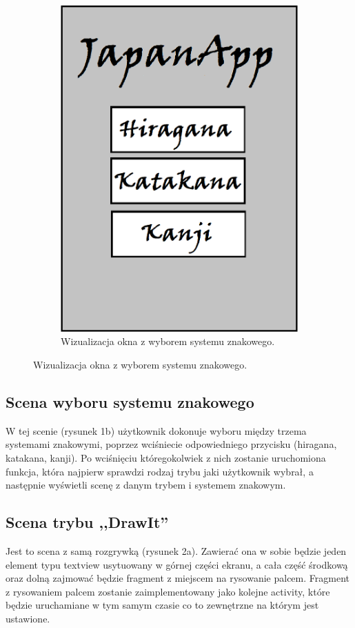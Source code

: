 \documentclass[15pt]{article}
\begin{document}
\begin{figure}[h!]
\begin{subfigure}[b]{0.35\linewidth}
      \includegraphics[width=\linewidth]{chose.png}
      \caption{Wizualizacja okna z wyborem systemu znakowego.}
      \label{fig:rysunek2}
    \end{subfigure}
  \end{figure}
  
  \subsection{Scena wyboru systemu znakowego}
  W tej scenie (rysunek 1b) użytkownik dokonuje wyboru między trzema systemami znakowymi, poprzez wciśniecie odpowiedniego przycisku (hiragana, katakana, kanji). Po wciśnięciu któregokolwiek z nich zostanie uruchomiona funkcja, która najpierw sprawdzi rodzaj trybu jaki użytkownik wybrał, a następnie wyświetli scenę z danym trybem i systemem znakowym. 
  
  
  \subsection{Scena trybu ,,DrawIt''}
  Jest to scena z samą rozgrywką (rysunek 2a). Zawierać ona w sobie będzie jeden element typu textview usytuowany w górnej części ekranu, a cała część środkową oraz dolną zajmować będzie fragment z miejscem na rysowanie palcem. Fragment z rysowaniem palcem zostanie zaimplementowany jako kolejne activity, które będzie uruchamiane w tym samym czasie co to zewnętrzne na którym jest ustawione. 
  
\end{document}
